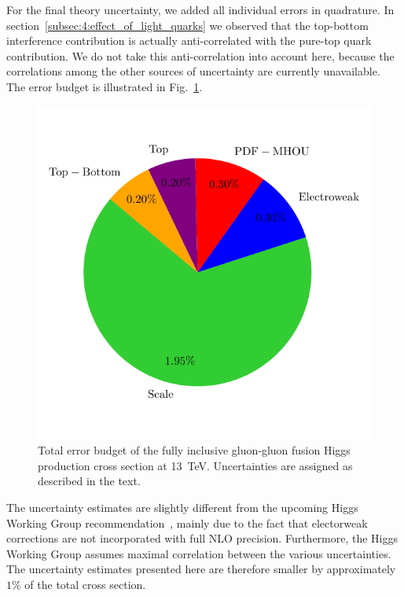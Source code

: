 For the final theory uncertainty, we added all individual errors in quadrature. In section~\ref{subsec:4:effect_of_light_quarks} we observed that the top-bottom interference contribution is actually anti-correlated with the pure-top quark contribution. We do not take this anti-correlation into account here, because the correlations among the other sources of uncertainty are currently unavailable. The error budget is illustrated in Fig.~\ref{fig:6:error_budget}.
\begin{figure}[h]
\centering
\includegraphics[scale=0.8]{Images/error_budget_after.pdf}
\caption{Total error budget of the fully inclusive gluon-gluon fusion Higgs production cross section at 13~TeV. Uncertainties are assigned as described in the text.}
\label{fig:6:error_budget}
\end{figure}

The uncertainty estimates are slightly different from the upcoming Higgs Working Group recommendation~\cite{Cappati:2024}, mainly due to the fact that electorweak corrections are not incorporated with full \acs{NLO} precision. Furthermore, the Higgs Working Group assumes maximal correlation between the various uncertainties. The uncertainty estimates presented here are therefore smaller by approximately $1\%$ of the total cross section.

